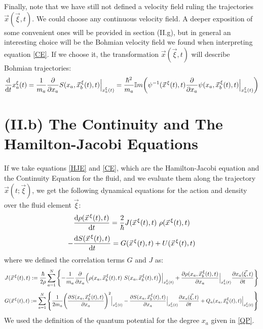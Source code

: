 \documentclass[11pt, a4paper]{article} %
\begin{document}
Finally, note that we have still not defined a velocity field ruling the trajectories $\vec{x}(\vec{\xi},t)$. We could choose any continuous velocity field. A deeper exposition of some convenient ones will be provided in section (II.g), but in general an interesting choice will be the Bohmian velocity field we found when interpreting equation \eqref{CE}. If we choose it, the transformation $\vec{x}(\vec{\xi},t)$ will describe Bohmian trajectories:
\begin{equation}\label{ImpBohm}
\dv{}{t}x_a^\xi(t)=\frac{1}{m_a}\pdv{}{x_a}S(x_a, \vec{x}_b^{\, \xi}(t),t)\Big\rvert_{x^\xi_a(t)}=\frac{\hbar^2}{m_a}\mathbb{I}m \qty( \psi^{-1}(\vec{x}^{\, \xi}(t),t)\pdv{}{x_a}\psi(x_a, \vec{x}_b^{\, \xi}(t),t)\Big\rvert_{x^\xi_a(t)})
\end{equation}

\newpage
\section*{(II.b) The Continuity and The Hamilton-Jacobi Equations\vspace{-0.3cm}}

If we take equations \eqref{HJE} and \eqref{CE}, which are the Hamilton-Jacobi equation and the Continuity Equation for the fluid, and we evaluate them along the trajectory $\vec{x}(t;\vec{\xi})$, we get the following dynamical equations for the action and density over the fluid element $\vec{\xi}$:
\begin{equation}\label{CE.L}
\dv{\rho(\vec{x}^{\, \xi}(t),t)}{t}=\frac{2}{\hbar}J(\vec{x}^{\, \xi}(t),t)\ \rho(\vec{x}^{\, \xi}(t),t)
\end{equation}
\begin{equation}\label{HJE.L}
-\dv{S(\vec{x}^{\, \xi}(t),t)}{t}=G(\vec{x}^{\, \xi}(t),t)+U(\vec{x}^{\, \xi}(t),t)
\end{equation}
where we defined the correlation terms $G$ and $J$ as:
\begin{equation}\label{JL}
J(\vec{x}^{\, \xi}(t),t):=\frac{\hbar}{2\rho}\sum_{a=1}^N\qty{-\frac{1}{m_a}\pdv{}{x_a}\qty(\rho(x_a, \vec{x}_b^{\, \xi}(t),t)\ S(x_a, \vec{x}_b^{\, \xi}(t),t))\Big\rvert_{x_a^\xi(t)}+\pdv{\rho(x_a, \vec{x}_b^{\, \xi}(t),t)}{x_a}\Big\rvert_{x_a^\xi(t)}\pdv{x_a(\vec{\xi},t)}{t}}
\end{equation}
\begin{equation}\label{GL}
G(\vec{x}^{\, \xi}(t),t):=\sum_{a=1}^N\qty{\frac{1}{2m_a}\qty(\pdv{S(x_a, \vec{x}_b^{\, \xi}(t),t)}{x_a})^2\Big\rvert_{x_a^\xi(t)}-\pdv{S(x_a, \vec{x}_b^{\, \xi}(t),t)}{x_a}\Big\rvert_{x_a^\xi(t)}\pdv{x_a(\vec{\xi},t)}{t}+Q_a(x_a, \vec{x}_b^{\, \xi}(t),t)\Big\rvert_{x_a^\xi(t)}}\vspace{-0.1cm}
\end{equation}
We used the definition of the quantum potential for the degree $x_a$ given in \eqref{QP}.
\end{document}
